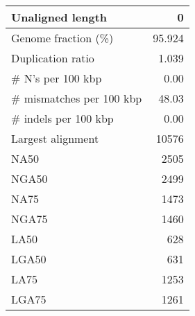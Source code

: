 \documentclass[12pt,a4paper]{article}
\begin{document}
\begin{table}[ht]
\begin{center}
\begin{tabular}{|l*{1}{|r}|}
Unaligned length & 0 \\ \hline
Genome fraction (\%) & 95.924 \\ \hline
Duplication ratio & 1.039 \\ \hline
\# N's per 100 kbp & 0.00 \\ \hline
\# mismatches per 100 kbp & 48.03 \\ \hline
\# indels per 100 kbp & 0.00 \\ \hline
Largest alignment & 10576 \\ \hline
NA50 & 2505 \\ \hline
NGA50 & 2499 \\ \hline
NA75 & 1473 \\ \hline
NGA75 & 1460 \\ \hline
LA50 & 628 \\ \hline
LGA50 & 631 \\ \hline
LA75 & 1253 \\ \hline
LGA75 & 1261 \\ \hline
\end{tabular}
\end{center}
\end{table}
\end{document}
